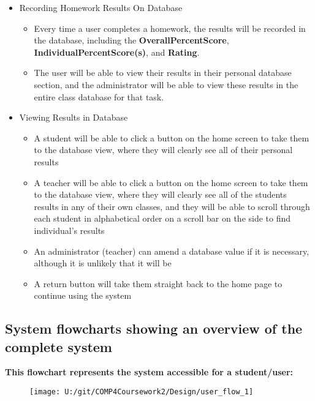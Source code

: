 \begin{itemize}
	\item Recording Homework Results On Database
	\begin{itemize}
		\item Every time a user completes a homework, the results will be recorded in the database, including the \textbf{OverallPercentScore}, \textbf{IndividualPercentScore(s)}, and \textbf{Rating}. 
		\item The user will be able to view their results in their personal database section, and the administrator will be able to view these results in the entire class database for that task.
	\end{itemize}
\end{itemize}

\begin{itemize}
	\item Viewing Results in Database
	\begin{itemize}
		\item A student will be able to click a button on the home screen to take them to the database view, where they will clearly see all of their personal results
		\item A teacher will be able to click a button on the home screen to take them to the database view, where they will clearly see all of the students results in any of their own classes, and they will be able to scroll through each student in alphabetical order on a scroll bar on the side to find individual's results
		\item An administrator (teacher) can amend a database value if it is necessary, although it is unlikely that it will be
		\item A return button will take them straight back to the home page to continue using the system
	\end{itemize}
\end{itemize}

\subsection{System flowcharts showing an overview of the complete system}

\textbf{This flowchart represents the system accessible for a student/user: }

\begin{figure}[H]
    \texttt{[image: U:/git/COMP4Coursework2/Design/user\_flow\_1]}
    \label{fig:print_function_result}\caption{}
\end{figure}

